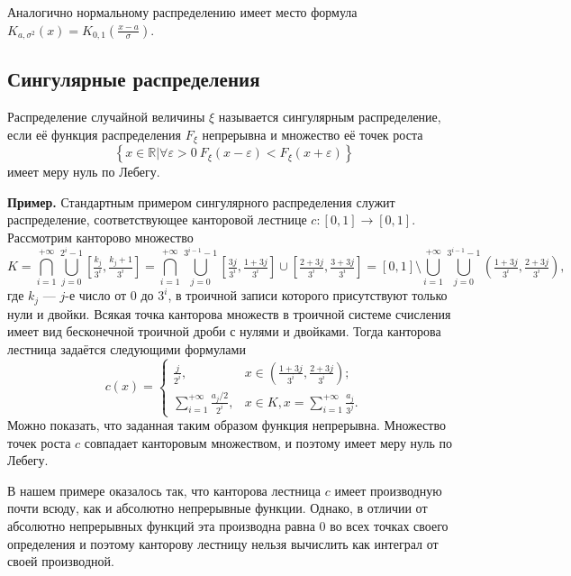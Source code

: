 \documentclass[12pt]{article}
\numberwithin{theorem}{section}
\theoremstyle{definition}
\newenvironment{example}{\indent \textbf{Пример.}}{\indent}
\newcommand{\defin}[2]{\hypertarget{#2}{{\color{red} #1}}}
\newcommand{\RR}{\mathbb{R}}
\newcommand{\defineset}[2]{\left\{
	\left.
	#1
	\right\vert
	#2
	\right\}}
\begin{document}
	Аналогично нормальному распределению имеет место формула
	$ K_{a,\sigma^2}(x) = K_{0, 1}(\tfrac{x - a}{\sigma}) $.
	
	\subsection{Сингулярные распределения}
	
	Распределение случайной величины $ \xi $ называется \defin{сингулярным распределение}{singular-distribution},
	если её функция распределения $ F_\xi $ непрерывна и множество её точек роста 
	$$ \defineset{x \in \RR}{\forall \varepsilon > 0 \ F_\xi(x - \varepsilon) < F_\xi(x + \varepsilon)} $$
	имеет меру нуль по Лебегу.
	
	\begin{example}
		Стандартным примером сингулярного распределения служит распределение, соответствующее канторовой лестнице 
		$ c \colon [0, 1] \to [0, 1] $.
		Рассмотрим канторово множество 
		$$ K = \bigcap\limits_{i = 1}^{+\infty} 
		\bigcup\limits_{j = 0}^{2^i - 1} \left[\tfrac{k_j}{3^i}, \tfrac{k_j + 1}{3^i}\right]
		= \bigcap\limits_{i = 1}^{+\infty} 
		\bigcup\limits_{j = 0}^{3^{i - 1} - 1} 
		\left[\tfrac{3j}{3^i}, \tfrac{1 + 3j}{3^i}\right] \cup \left[\tfrac{2 + 3j}{3^i}, \tfrac{3 + 3j}{3^i}\right]
		= [0, 1] \setminus \bigcup\limits_{i = 1}^{+\infty} 
		\bigcup\limits_{j = 0}^{3^{i - 1} - 1} \left(\tfrac{1 + 3j}{3^i}, \tfrac{2 + 3j}{3^i}\right), $$ 
		где $ k_j $ --- $ j $-е число от $ 0 $ до $ 3^i $, в троичной записи которого присутствуют только нули и двойки.
		Всякая точка канторова множеств в троичной системе
		счисления имеет вид бесконечной троичной дроби с нулями и двойками.
		Тогда канторова лестница задаётся следующими формулами
		$$ c(x)
		=
		\begin{cases}
			\tfrac{j}{2^i}, & x \in \left(\tfrac{1 + 3j}{3^i}, \tfrac{2 + 3j}{3^i}\right); \\
			\sum\limits_{i = 1}^{+\infty} \tfrac{a_j / 2}{2^i}, & x \in K, x = \sum\limits_{i = 1}^{+\infty} \tfrac{a_j}{3^j}.
		\end{cases} $$
		Можно показать, что заданная таким образом функция непрерывна. 
		Множество точек роста $ c $ совпадает канторовым множеством,
		и поэтому имеет меру нуль по Лебегу.
		
		В нашем примере оказалось так, что канторова лестница $ c $ имеет производную почти всюду, 
		как и абсолютно непрерывные функции. Однако, в отличии от абсолютно непрерывных функций
		эта производна равна 0 во всех точках своего определения и поэтому канторову лестницу нельзя вычислить 
		как интеграл от своей производной.		
	\end{example}
	
\end{document}

